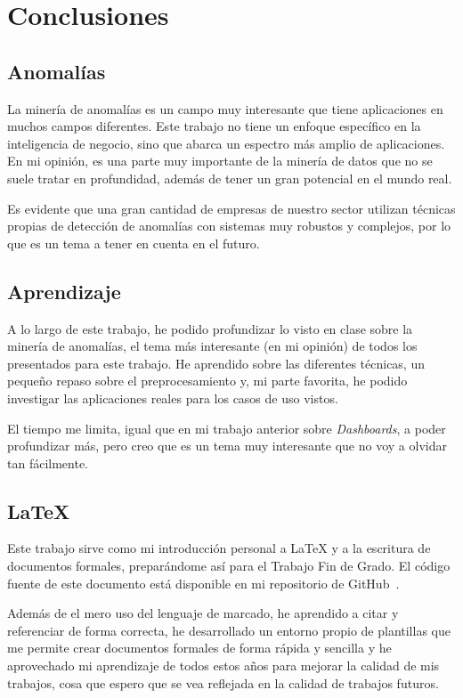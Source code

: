 \chapter{Conclusiones}
\section{Anomalías}
La minería de anomalías es un campo muy interesante que tiene aplicaciones en muchos
campos diferentes. Este trabajo no tiene un enfoque específico en la inteligencia de
negocio, sino que abarca un espectro más amplio de aplicaciones. En mi opinión, es
una parte muy importante de la minería de datos que no se suele tratar en profundidad,
además de tener un gran potencial en el mundo real.

Es evidente que una gran cantidad de empresas de nuestro sector utilizan técnicas
propias de detección de anomalías con sistemas muy robustos y complejos, por lo que
es un tema a tener en cuenta en el futuro.

\section{Aprendizaje}
A lo largo de este trabajo, he podido profundizar lo visto en clase sobre la minería de
anomalías, el tema más interesante (en mi opinión) de todos los presentados para este
trabajo. He aprendido sobre las diferentes técnicas, un pequeño repaso sobre el
preprocesamiento y, mi parte favorita, he podido investigar las aplicaciones reales
para los casos de uso vistos.

El tiempo me limita, igual que en mi trabajo anterior sobre \textit{Dashboards}, a
poder profundizar más, pero creo que es un tema muy interesante que no voy a olvidar
tan fácilmente.

\section{\LaTeX}
Este trabajo sirve como mi introducción personal a \LaTeX{} y a la escritura de documentos formales, preparándome así para el Trabajo Fin de Grado.
El código fuente de este documento está disponible en mi repositorio de GitHub~\cite{source}.

Además de el mero uso del lenguaje de marcado, he aprendido a citar y referenciar de forma correcta,
he desarrollado un entorno propio de plantillas que me permite crear documentos formales de forma rápida y
sencilla y he aprovechado mi aprendizaje de todos estos años para mejorar la calidad de mis trabajos,
cosa que espero que se vea reflejada en la calidad de trabajos futuros.
